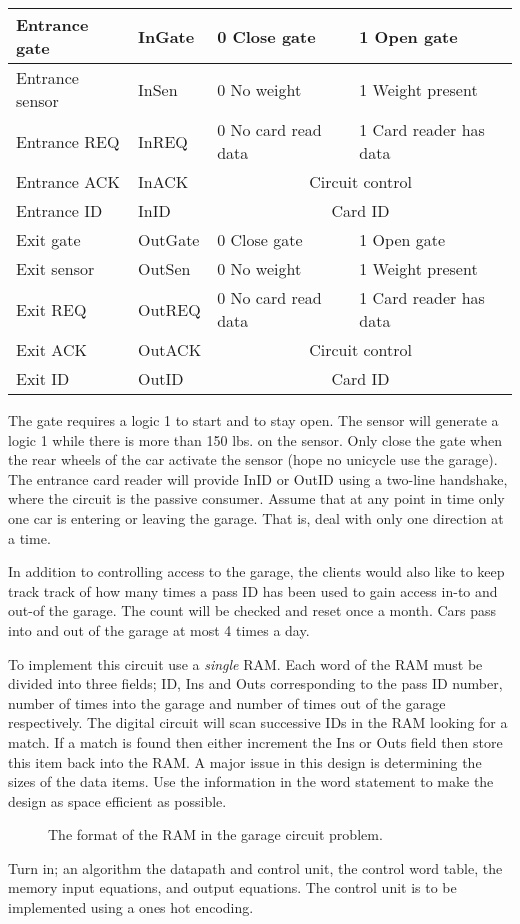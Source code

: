 \begin{enumerate}
\begin{tabular}{|l|l||l|l|} \hline
Entrance gate	& InGate	& 0 Close gate & 1 Open gate \\ \hline
Entrance sensor	& InSen		& 0 No weight &  1 Weight present \\ \hline
Entrance REQ	& InREQ		& 0 No card read data & 1 Card reader has data  \\ \hline
Entrance ACK	& InACK		& \multicolumn{2}{c|}{Circuit control}   \\ \hline
Entrance ID	& InID		& \multicolumn{2}{c|}{Card ID} \\ \hline
Exit gate	& OutGate	& 0 Close gate &  1 Open gate \\ \hline
Exit sensor	& OutSen	& 0 No weight & 1 Weight present\\ \hline
Exit REQ	& OutREQ	& 0 No card read data & 1 Card reader has data  \\ \hline
Exit ACK	& OutACK	& \multicolumn{2}{c|}{Circuit control}   \\ \hline
Exit ID		& OutID		& \multicolumn{2}{c|}{Card ID} \\ \hline
\end{tabular}

The gate requires a logic 1 to start and to stay open. The sensor will 
generate a logic 1 while there is more than 150 lbs. on the sensor.  Only
close the gate when the rear wheels of the car activate the
sensor (hope no unicycle use the garage).  The entrance card reader 
will provide InID or OutID using a 
two-line handshake, where the circuit is the passive consumer.
Assume that at any point in time only one car is
entering or leaving the garage.  That is, deal with only
one direction at a time.

In addition to controlling access to the garage, the clients would also
like to keep track track of how many times a pass ID has been used to
gain access in-to and out-of the garage.  The count will be checked and
reset once a month.  Cars pass into and out of the garage at most 4
times a day.

To implement this circuit use a \textit{ single} RAM.  Each word of the
RAM must be divided into three fields; ID, Ins and Outs corresponding to
the pass ID number, number of times into the garage and number of times
out of the garage respectively.   The digital circuit will scan successive
IDs in the RAM looking for a match.  If a match 
is found then either increment the Ins or Outs field then store this 
item back into the RAM.  A major issue in this design is determining
the sizes of the data items.  Use the information in the word statement
to make the design as space efficient as possible.
\begin{figure}[ht]
\caption{The format of the RAM in the garage circuit problem.}
\label{fig:GarRAM}
\end{figure}
Turn in; an algorithm the datapath and control unit, the control word 
table, the memory input equations, and output equations.  
The control unit is to be implemented using a ones hot encoding.



\end{enumerate}
